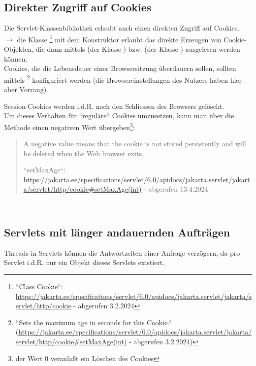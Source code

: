 \subsection{Direkter Zugriff auf Cookies}\label{sec:cookieaccess}
Die Servlet-Klassenbibliothek erlaubt auch einen direkten Zugriff auf Cookies.\\

\noindent
$\rightarrow$ die Klasse \footnote{
``Class Cookie``: \url{https://jakarta.ee/specifications/servlet/6.0/apidocs/jakarta.servlet/jakarta/servlet/http/cookie} - abgerufen 3.2.2024
} mit dem Konstruktor  erlaubt das direkte Erzeugen von Cookie-Objekten, die dann mittels  (der Klasse ) bzw.  (der Klasse ) ausgelesen werden können.\\

\noindent
Cookies, die die Lebensdauer einer Browsersitzung überdauern sollen, sollten mittels \footnote{
    ``Sets the maximum age in seconds for this Cookie.`` (\url{https://jakarta.ee/specifications/servlet/6.0/apidocs/jakarta.servlet/jakarta/servlet/http/cookie#setMaxAge(int)} - abgerufen 3.2.2024)
} konfiguriert werden (die Browsereinstellungen des Nutzers haben hier aber Vorrang).


\begin{tcolorbox}
    Session-Cookies werden i.d.R. nach den Schliessen des Browsers gelöscht.\\ Um dieses Verhalten für ``reguläre`` Cookies umzusetzen, kann man über die Methode  einen negativen Wert übergeben\footnote{der Wert $0$ veranlaßt ein Löschen des Cookies}:

    \blockquote[{``setMaxAge``: \url{https://jakarta.ee/specifications/servlet/6.0/apidocs/jakarta.servlet/jakarta/servlet/http/cookie#setMaxAge(int)} - abgerufen 13.4.2024}]{
        A negative value means that the cookie is not stored persistently and will be deleted when the Web browser exits.
    }
\end{tcolorbox}\\


\subsection{Servlets mit länger andauernden Aufträgen}
Threads in Servlets können die Antwortzeiten einer Anfrage verzögern, da pro Servlet i.d.R. nur ein Objekt dieses Servlets existiert.\\

